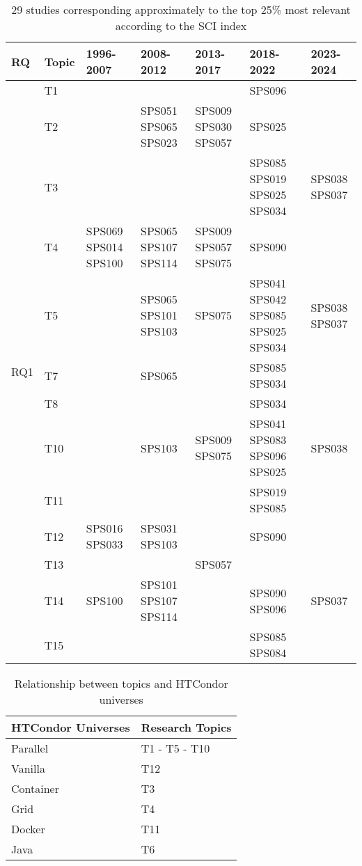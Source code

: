 \begin{table*}[htbp]
    \renewcommand{\arraystretch}{1.3}
    \setlength{\tabcolsep}{3pt}
    \centering
    \caption{29 studies corresponding approximately to the top 25\% most relevant according to the SCI index}
    \begin{tabular}{p{0.8cm}p{0.9cm}p{2.7cm}p{2.7cm}p{2.7cm}p{2.7cm}p{1.7cm}}
        \hline
        \textbf{RQ} & \textbf{Topic} & \textbf{1996-2007} & \textbf{2008-2012} & \textbf{2013-2017} & \textbf{2018-2022} & \textbf{2023-2024} \\
        \hline
        \multirow{16}{*}{RQ1} & T1 &  &  &  & SPS096 & \\
        & T2 &  & SPS051 SPS065 SPS023 & SPS009 SPS030 SPS057 & SPS025 & \\
        & T3 &  &  &  & SPS085 SPS019 SPS025 SPS034 & SPS038 SPS037 \\
        & T4 & SPS069 SPS014 SPS100 & SPS065 SPS107 SPS114 & SPS009 SPS057 SPS075 & SPS090 & \\
        & T5 &  & SPS065 SPS101 SPS103 & SPS075 & SPS041 SPS042 SPS085 SPS025 SPS034 & SPS038 SPS037 \\
        & T7 &  & SPS065 &  & SPS085 SPS034 & \\
        & T8 &  &  &  & SPS034 & \\
        & T10 &  & SPS103 & SPS009 SPS075 & SPS041 SPS083 SPS096 SPS025 & SPS038 \\
        & T11 &  &  &  & SPS019 SPS085 & \\
        & T12 & SPS016 SPS033 & SPS031 SPS103 &  & SPS090 & \\
        \hline
        \multirow{3}{*}{RQ2} & T13 &  &  & SPS057 &  & \\
        & T14 & SPS100 & SPS101 SPS107 SPS114 &  & SPS090 SPS096 & SPS037 \\
        & T15 &  &  &  & SPS085 SPS084 & \\
        \hline
    \end{tabular}
    \label{table:highest_SCI}
\end{table*}

\begin{table}[ht]
    \renewcommand{\arraystretch}{1.3}
    \centering
    \caption{Relationship between topics and HTCondor universes}
    \begin{tabular}{p{3.5cm}p{3.5cm}}
        \hline
        \textbf{HTCondor Universes} & \textbf{Research Topics} \\
        \hline
        Parallel & T1 - T5 - T10 \\
        Vanilla & T12 \\
        Container & T3 \\
        Grid & T4 \\
        Docker & T11 \\
        Java & T6 \\
        \hline
    \end{tabular}
    \label{table:topics_universes}
\end{table}